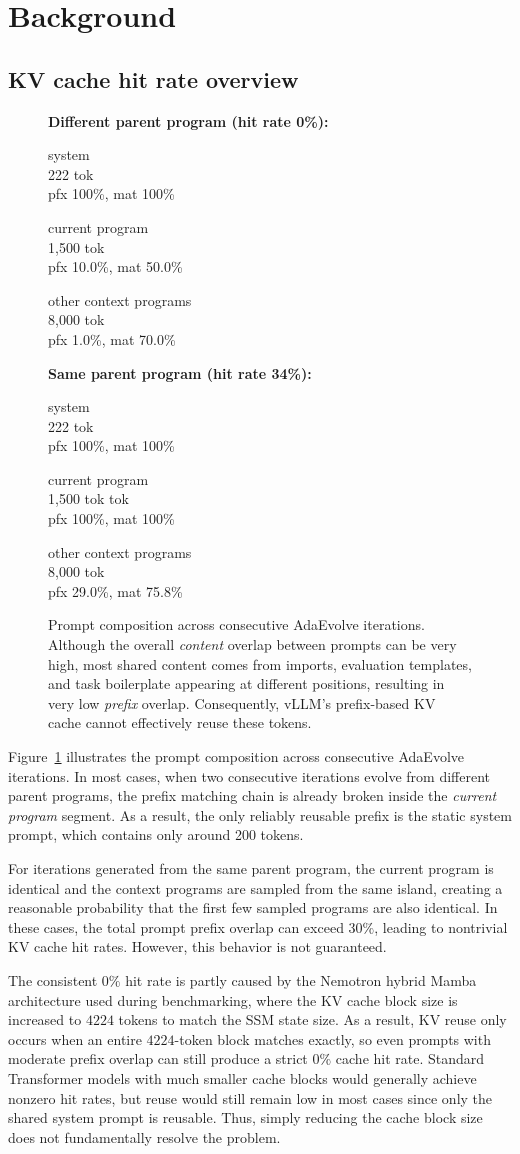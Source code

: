 \documentclass{article}
\newcommand{\promptdiagram}{%
\vspace{4pt}%
  \noindent\textbf{\small Different parent program (hit rate 0\%):}
  \par\vspace{3pt}%
  \noindent
  \colorbox{berkeleyblue!15}{%
    \begin{minipage}[c][3.0em]{\dimexpr0.18\linewidth-2\fboxsep\relax}%
      \centering\scriptsize system\\[-1pt]
      \tiny 222 tok\\[-1pt]
      \tiny pfx 100\%, mat 100\%
    \end{minipage}}%
  \makebox[0pt][c]{\Large$|$}%
  \colorbox{red!18}{%
    \begin{minipage}[c][3.0em]{\dimexpr0.18\linewidth-2\fboxsep\relax}%
      \centering\scriptsize current program\\[-1pt]
      \tiny 1{,}500 tok\\[-1pt]
      \tiny pfx 10.0\%, mat 50.0\%
    \end{minipage}}%
  \makebox[0pt][c]{\Large$|$}%
  \colorbox{cyan!20}{%
    \begin{minipage}[c][3.0em]{\dimexpr0.64\linewidth-2\fboxsep\relax}%
      \centering\scriptsize other context programs\\[-1pt]
      \tiny 8{,}000 tok\\[-1pt]
      \tiny pfx 1.0\%, mat 70.0\%
    \end{minipage}}%
    
  \vspace{4pt}%

  \noindent\textbf{\small Same parent program (hit rate 34\%):}
  \par\vspace{3pt}%
  \noindent
  \colorbox{berkeleyblue!15}{%
    \begin{minipage}[c][3.0em]{\dimexpr0.18\linewidth-2\fboxsep\relax}%
      \centering\scriptsize system\\[-1pt]
      \tiny 222 tok\\[-1pt]
      \tiny pfx 100\%, mat 100\%
    \end{minipage}}%
  \makebox[0pt][c]{\Large$|$}%
  \colorbox{berkeleygold!40}{%
    \begin{minipage}[c][3.0em]{\dimexpr0.18\linewidth-2\fboxsep\relax}%
      \centering\scriptsize current program\\[-1pt]
      \tiny 1{,}500 tok tok\\[-1pt]
      \tiny pfx 100\%, mat 100\%
    \end{minipage}}%
  \makebox[0pt][c]{\Large$|$}%
  \colorbox{cyan!20}{%
    \begin{minipage}[c][3.0em]{\dimexpr0.64\linewidth-2\fboxsep\relax}%
      \centering\scriptsize other context programs\\[-1pt]
      \tiny 8{,}000 tok\\[-1pt]
      \tiny pfx 29.0\%, mat 75.8\%
    \end{minipage}}%



}
\begin{document}
\section{Background}
\subsection{}
\subsection{KV cache hit rate overview}
\begin{figure}[!htbp]
    \centering
    \promptdiagram
    \caption{
    Prompt composition across consecutive AdaEvolve iterations. Although the overall \textit{content} overlap between prompts can be very high, most shared content comes from imports, evaluation templates, and task boilerplate appearing at different positions, resulting in very low \textit{prefix} overlap. Consequently, vLLM's prefix-based KV cache cannot effectively reuse these tokens.
    }
    \label{fig:prompt_kv_cache}
\end{figure}

Figure~\ref{fig:prompt_kv_cache} illustrates the prompt composition across consecutive AdaEvolve iterations. In most cases, when two consecutive iterations evolve from different parent programs, the prefix matching chain is already broken inside the \textit{current program} segment. As a result, the only reliably reusable prefix is the static system prompt, which contains only around 200 tokens.

For iterations generated from the same parent program, the current program is identical and the context programs are sampled from the same island, creating a reasonable probability that the first few sampled programs are also identical. In these cases, the total prompt prefix overlap can exceed $30\%$, leading to nontrivial KV cache hit rates. However, this behavior is not guaranteed.

The consistent $0\%$ hit rate is partly caused by the Nemotron hybrid Mamba architecture used during benchmarking, where the KV cache block size is increased to $4224$ tokens to match the SSM state size. As a result, KV reuse only occurs when an entire $4224$-token block matches exactly, so even prompts with moderate prefix overlap can still produce a strict $0\%$ cache hit rate. Standard Transformer models with much smaller cache blocks would generally achieve nonzero hit rates, but reuse would still remain low in most cases since only the shared system prompt is reusable. Thus, simply reducing the cache block size does not fundamentally resolve the problem.
\end{document}
